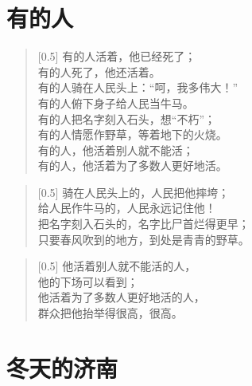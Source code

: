 \documentclass[12pt,UTF-8,openany]{ctexbook}
\begin{document}
\chapter{有的人}

\begin{large}
    
    \begin{verse}[0.5\linewidth]
        有的人活着，他已经死了； \\
        有的人死了，他还活着。 \\
        有的人骑在人民头上：“呵，我多伟大！” \\
        有的人俯下身子给人民当牛马。 \\
        有的人把名字刻入石头，想“不朽”； \\
        有的人情愿作野草，等着地下的火烧。 \\
        有的人，他活着别人就不能活； \\
        有的人，他活着为了多数人更好地活。
    \end{verse}
    
    
    \begin{verse}[0.5\linewidth]
        骑在人民头上的，人民把他摔垮； \\
        给人民作牛马的，人民永远记住他！ \\
        把名字刻入石头的，名字比尸首烂得更早； \\
        只要春风吹到的地方，到处是青青的野草。
    \end{verse}
    
    
    \begin{verse}[0.5\linewidth]
        他活着别人就不能活的人， \\
        他的下场可以看到； \\
        他活着为了多数人更好地活的人， \\
        群众把他抬举得很高，很高。
    \end{verse}
    
\end{large}



\chapter{冬天的济南}
\end{document}
